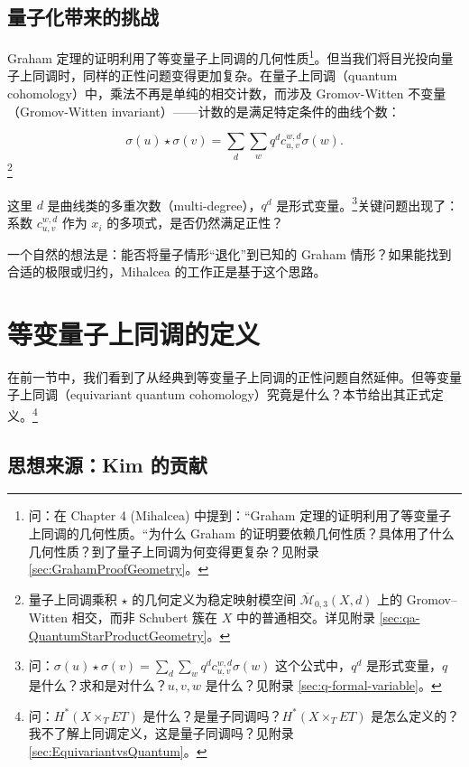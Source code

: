 \subsection{量子化带来的挑战}

Graham 定理的证明利用了等变量子上同调的几何性质\footnote{问：在 Chapter 4 (Mihalcea) 中提到：``Graham 定理的证明利用了等变量子上同调的几何性质。``为什么 Graham 的证明要依赖几何性质？具体用了什么几何性质？到了量子上同调为何变得更复杂？见附录 \cref{sec:GrahamProofGeometry}。}。但当我们将目光投向量子上同调时，同样的正性问题变得更加复杂。在量子上同调（quantum cohomology）中，乘法不再是单纯的相交计数，而涉及 Gromov-Witten 不变量（Gromov-Witten invariant）\cite{Kontsevich1994,Gromov1985}——计数的是满足特定条件的曲线个数：

\begin{equation}
\sigma(u) \star \sigma(v) = \sum_{d} \sum_{w} q^d c_{u,v}^{w,d} \sigma(w).
\label{eq:QuantumProduct}
\end{equation}\footnote{量子上同调乘积 $\star$ 的几何定义为稳定映射模空间 $\overline{\mathcal{M}}_{0,3}(X,d)$ 上的 Gromov--Witten 相交，而非 Schubert 簇在 $X$ 中的普通相交。详见附录 \cref{sec:qa-QuantumStarProductGeometry}。}

这里 $d$ 是曲线类的多重次数（multi-degree），$q^d$ 是形式变量。\footnote{问：$\sigma(u) \star \sigma(v) = \sum_d \sum_w q^d c_{u,v}^{w,d} \sigma(w)$ 这个公式中，$q^d$ 是形式变量，$q$ 是什么？求和是对什么？$u, v, w$ 是什么？见附录 \cref{sec:q-formal-variable}。}关键问题出现了：系数 $c_{u,v}^{w,d}$ 作为 $x_i$ 的多项式，是否仍然满足正性？

一个自然的想法是：能否将量子情形``退化''到已知的 Graham 情形？如果能找到合适的极限或归约，Mihalcea 的工作正是基于这个思路。

\section{等变量子上同调的定义}
\label{sec:EQCDefinition}

在前一节中，我们看到了从经典到等变量子上同调的正性问题自然延伸。但等变量子上同调（equivariant quantum cohomology）究竟是什么？本节给出其正式定义。\footnote{问：$H^*(X \times_T ET)$ 是什么？是量子同调吗？$H^*(X \times_T ET)$ 是怎么定义的？我不了解上同调定义，这是量子同调吗？见附录 \cref{sec:EquivariantvsQuantum}。}

\subsection{思想来源：Kim 的贡献}

